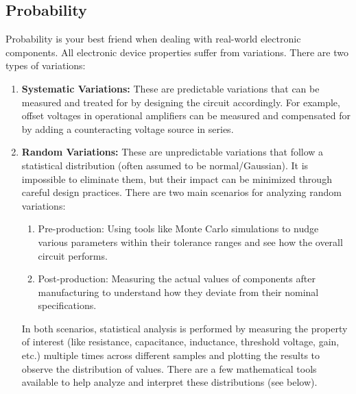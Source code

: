 \subsection{Probability}
\label{sec:theory_general_probability}

Probability is your best friend when dealing with real-world
electronic components. All electronic device properties suffer
from variations. There are two types of variations:
\begin{enumerate}
  \item \textbf{Systematic Variations:} These are predictable
    variations that can be measured and treated for by designing
    the circuit accordingly. For example, offset voltages in
    operational amplifiers can be measured and compensated for
    by adding a counteracting voltage source in series.
  \item \textbf{Random Variations:} These are unpredictable
    variations that follow a statistical distribution (often
    assumed to be normal/Gaussian). It is impossible to
    eliminate them, but their impact can be minimized through
    careful design practices. There are two main scenarios for
    analyzing random variations:
    \begin{enumerate}
      \item Pre-production: Using tools like Monte Carlo
        simulations to nudge various parameters within their
        tolerance ranges and see how the overall circuit performs.
      \item Post-production: Measuring the actual values of
        components after manufacturing to understand how they
        deviate from their nominal specifications.
    \end{enumerate}
    In both scenarios, statistical analysis is performed by
    measuring the property of interest (like resistance,
    capacitance, inductance, threshold voltage, gain, etc.)
    multiple times across different samples and plotting the
    results to observe the distribution of values. There are
    a few mathematical tools available to help analyze and
    interpret these distributions (see below).
\end{enumerate}

